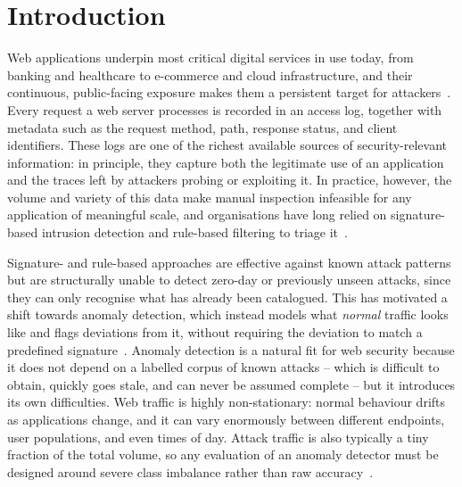 \documentclass[futureinternet,article,accept,moreauthors]{Definitions/mdpi}
\begin{document}
\section{Introduction}

Web applications underpin most critical digital services in use today, from banking and healthcare to e-commerce and cloud infrastructure, and their continuous, public-facing exposure makes them a persistent target for attackers~\cite{scarfone2007}. Every request a web server processes is recorded in an access log, together with metadata such as the request method, path, response status, and client identifiers. These logs are one of the richest available sources of security-relevant information: in principle, they capture both the legitimate use of an application and the traces left by attackers probing or exploiting it. In practice, however, the volume and variety of this data make manual inspection infeasible for any application of meaningful scale, and organisations have long relied on signature-based intrusion detection and rule-based filtering to triage it~\cite{scarfone2007}.

Signature- and rule-based approaches are effective against known attack patterns but are structurally unable to detect zero-day or previously unseen attacks, since they can only recognise what has already been catalogued. This has motivated a shift towards anomaly detection, which instead models what \emph{normal} traffic looks like and flags deviations from it, without requiring the deviation to match a predefined signature~\cite{chandola2009}. Anomaly detection is a natural fit for web security because it does not depend on a labelled corpus of known attacks -- which is difficult to obtain, quickly goes stale, and can never be assumed complete -- but it introduces its own difficulties. Web traffic is highly non-stationary: normal behaviour drifts as applications change, and it can vary enormously between different endpoints, user populations, and even times of day. Attack traffic is also typically a tiny fraction of the total volume, so any evaluation of an anomaly detector must be designed around severe class imbalance rather than raw accuracy~\cite{chandola2009}.
\end{document}
